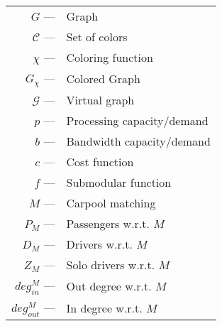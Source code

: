 \bgroup
\def\arraystretch{1.5}
\setlength\tabcolsep{2pt}
\begin{tabular}{r l}
$G$ --- &              Graph                                \\
$\mathcal{C}$ --- &              Set of colors        \\
$\chi$ --- &           Coloring function    \\
$G_{\chi}$ --- &       Colored Graph         \\
$\mathcal{G}$ --- &    Virtual graph    \\
$p$ --- &              Processing capacity/demand   \\
$b$ --- &              Bandwidth capacity/demand    \\
$c$ --- &              Cost function    \\
$f$ --- &              Submodular function  \\
$M$ --- &              Carpool matching \\
$P_M$ --- &            Passengers w.r.t. $M$    \\
$D_M$ --- &            Drivers w.r.t. $M$   \\
$Z_M$ --- &            Solo drivers w.r.t. $M$  \\
$deg^M_{in}$ --- &     Out degree w.r.t. $M$    \\
$deg^M_{out}$ --- &    In degree w.r.t. $M$ \\
\end{tabular}
\egroup
